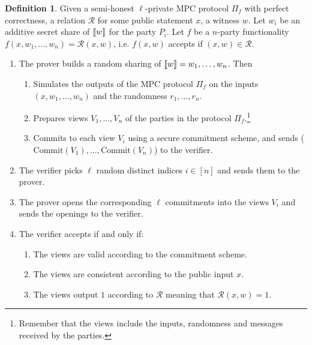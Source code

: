 \documentclass[twoside,11pt]{report}
\theoremstyle{definition}
\newtheorem{definition}{Definition}[section]
\theoremstyle{plain}
\begin{document}
\begin{definition}\label{def:mpcinth_basic}
  Given a semi-honest $\ell$-private MPC protocol $\Pi_f$ with perfect correctness, a relation $\mathcal{R}$ for some public statement $x$, a witness $w$. Let $w_i$ be an additive secret share of $\llbracket w \rrbracket$ for the party $P_i$. Let $f$ be a $n$-party functionality $f(x, w_1, \dots, w_n) = \mathcal{R}(x, w)$, i.e. $f(x,w)$ accepts if $(x,w) \in \mathcal{R}$.

  \begin{enumerate}[parsep=2pt, itemsep=0pt]
    \item The prover builds a random sharing of $\llbracket w \rrbracket = w_1, \dots, w_n$. Then
          \begin{enumerate}[nolistsep]
            \item Simulates the outputs of the MPC protocol $\Pi_f$ on the inputs $(x, w_1, \dots, w_n)$ and the randomness $r_1, \dots, r_n$.
            \item Prepares views $V_1, \dots, V_n$ of the parties in the protocol $\Pi_f$.\footnote{Remember that the views include the inputs, randomness and messages received by the parties.}
            \item Commits to each view $V_i$ using a secure commitment scheme, and sends ($\text{Commit}(V_1), \dots, \text{Commit}(V_n)$) to the verifier.
          \end{enumerate}
    \item The verifier picks $\ell$ random distinct indices $i \in [n]$ and sends them to the prover.
    \item The prover opens the corresponding $\ell$ commitments into the views $V_i$ and sends the openings to the verifier.
    \item The verifier accepts if and only if:
          \begin{enumerate}[nolistsep]
            \item\label{prop:mpcinth_commit} The views are valid according to the commitment scheme.
            \item\label{prop:mpcinth_consistent} The views are consistent according to the public input $x$.
            \item\label{prop:mpcinth_knowledge} The views output $1$ according to $\mathcal{R}$ meaning that $\mathcal{R}(x,w) = 1$.
          \end{enumerate}
  \end{enumerate}
\end{definition}
\end{document}

